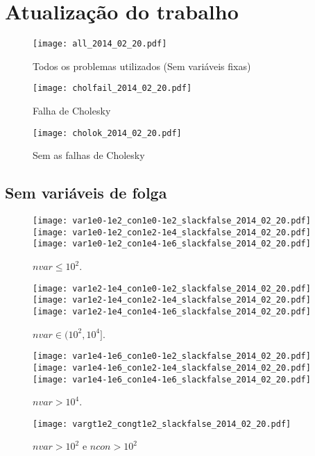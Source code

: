 \documentclass{article}
\begin{document}
\section{Atualização do trabalho}

\begin{figure}[H]
  \centering
  \texttt{[image: all\_2014\_02\_20.pdf]}
  \caption{Todos os problemas utilizados (Sem variáveis fixas) }
\end{figure}
\begin{figure}[H]
  \centering
  \texttt{[image: cholfail\_2014\_02\_20.pdf]}
  \caption{Falha de Cholesky}
\end{figure}
\begin{figure}[H]
  \centering
  \texttt{[image: cholok\_2014\_02\_20.pdf]}
  \caption{Sem as falhas de Cholesky}
\end{figure}

\newpage
\subsection{Sem variáveis de folga}

\begin{figure}[H]
\centering
\texttt{[image: var1e0-1e2\_con1e0-1e2\_slackfalse\_2014\_02\_20.pdf]}
\texttt{[image: var1e0-1e2\_con1e2-1e4\_slackfalse\_2014\_02\_20.pdf]}
\texttt{[image: var1e0-1e2\_con1e4-1e6\_slackfalse\_2014\_02\_20.pdf]}
\caption{ $nvar \leq 10^2$. }
\label{fig:nvar_small}
\end{figure}
\begin{figure}[H]
\centering
\texttt{[image: var1e2-1e4\_con1e0-1e2\_slackfalse\_2014\_02\_20.pdf]}
\texttt{[image: var1e2-1e4\_con1e2-1e4\_slackfalse\_2014\_02\_20.pdf]}
\texttt{[image: var1e2-1e4\_con1e4-1e6\_slackfalse\_2014\_02\_20.pdf]}
\caption{ $nvar \in (10^2,10^4]$. }
\label{fig:nvar_medium}
\end{figure}
\begin{figure}[H]
\centering
\texttt{[image: var1e4-1e6\_con1e0-1e2\_slackfalse\_2014\_02\_20.pdf]}
\texttt{[image: var1e4-1e6\_con1e2-1e4\_slackfalse\_2014\_02\_20.pdf]}
\texttt{[image: var1e4-1e6\_con1e4-1e6\_slackfalse\_2014\_02\_20.pdf]}
\caption{ $nvar > 10^4$. }
\label{fig:nvar_big}
\end{figure}

\begin{figure}[H]
\centering
\texttt{[image: vargt1e2\_congt1e2\_slackfalse\_2014\_02\_20.pdf]}
\caption{ $nvar > 10^2$ e $ncon > 10^2$ }
\label{fig:both_medium_and_big}
\end{figure}
\end{document}
